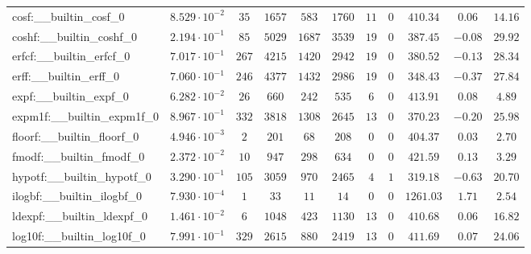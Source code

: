 \begin{tabular}{|l|c|c|c|c|c|c|c|c|c|c|}
cosf:\_\_builtin\_cosf\_0                 & $ 8.529 \cdot 10^{-2} $ & $ 35     $ & $ 1657  $ & $ 583   $ & $ 1760  $ & $ 11  $ & $ 0 $ & $ 410.34      $ & $ 0.06    $ & $ 14.16   $ \\
coshf:\_\_builtin\_coshf\_0               & $ 2.194 \cdot 10^{-1} $ & $ 85     $ & $ 5029  $ & $ 1687  $ & $ 3539  $ & $ 19  $ & $ 0 $ & $ 387.45      $ & $ -0.08   $ & $ 29.92   $ \\
erfcf:\_\_builtin\_erfcf\_0               & $ 7.017 \cdot 10^{-1} $ & $ 267    $ & $ 4215  $ & $ 1420  $ & $ 2942  $ & $ 19  $ & $ 0 $ & $ 380.52      $ & $ -0.13   $ & $ 28.34   $ \\
erff:\_\_builtin\_erff\_0                 & $ 7.060 \cdot 10^{-1} $ & $ 246    $ & $ 4377  $ & $ 1432  $ & $ 2986  $ & $ 19  $ & $ 0 $ & $ 348.43      $ & $ -0.37   $ & $ 27.84   $ \\
expf:\_\_builtin\_expf\_0                 & $ 6.282 \cdot 10^{-2} $ & $ 26     $ & $ 660   $ & $ 242   $ & $ 535   $ & $ 6   $ & $ 0 $ & $ 413.91      $ & $ 0.08    $ & $ 4.89    $ \\
expm1f:\_\_builtin\_expm1f\_0             & $ 8.967 \cdot 10^{-1} $ & $ 332    $ & $ 3818  $ & $ 1308  $ & $ 2645  $ & $ 13  $ & $ 0 $ & $ 370.23      $ & $ -0.20   $ & $ 25.98   $ \\
floorf:\_\_builtin\_floorf\_0             & $ 4.946 \cdot 10^{-3} $ & $ 2      $ & $ 201   $ & $ 68    $ & $ 208   $ & $ 0   $ & $ 0 $ & $ 404.37      $ & $ 0.03    $ & $ 2.70    $ \\
fmodf:\_\_builtin\_fmodf\_0               & $ 2.372 \cdot 10^{-2} $ & $ 10     $ & $ 947   $ & $ 298   $ & $ 634   $ & $ 0   $ & $ 0 $ & $ 421.59      $ & $ 0.13    $ & $ 3.29    $ \\
hypotf:\_\_builtin\_hypotf\_0             & $ 3.290 \cdot 10^{-1} $ & $ 105    $ & $ 3059  $ & $ 970   $ & $ 2465  $ & $ 4   $ & $ 1 $ & $ 319.18      $ & $ -0.63   $ & $ 20.70   $ \\
ilogbf:\_\_builtin\_ilogbf\_0             & $ 7.930 \cdot 10^{-4} $ & $ 1      $ & $ 33    $ & $ 11    $ & $ 14    $ & $ 0   $ & $ 0 $ & $ 1261.03     $ & $ 1.71    $ & $ 2.54    $ \\
ldexpf:\_\_builtin\_ldexpf\_0             & $ 1.461 \cdot 10^{-2} $ & $ 6      $ & $ 1048  $ & $ 423   $ & $ 1130  $ & $ 13  $ & $ 0 $ & $ 410.68      $ & $ 0.06    $ & $ 16.82   $ \\
log10f:\_\_builtin\_log10f\_0             & $ 7.991 \cdot 10^{-1} $ & $ 329    $ & $ 2615  $ & $ 880   $ & $ 2419  $ & $ 13  $ & $ 0 $ & $ 411.69      $ & $ 0.07    $ & $ 24.06   $ \\

\end{tabular}
